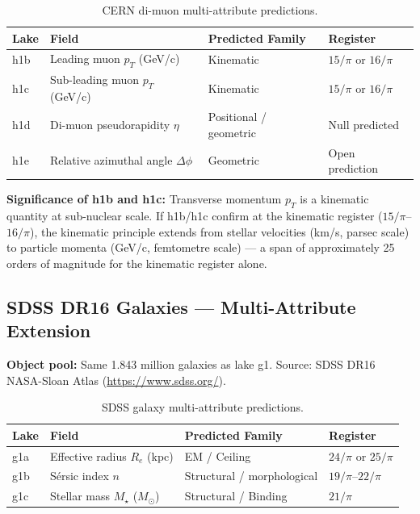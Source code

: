 \documentclass[12pt,a4paper]{article}
\begin{document}
\begin{table}[h!]
\centering
\caption{CERN di-muon multi-attribute predictions.}
\begin{tabular}{lp{4.5cm}p{4cm}l}
\toprule
\textbf{Lake} & \textbf{Field} & \textbf{Predicted Family} & \textbf{Register} \\
\midrule
h1b & Leading muon $p_T$ (GeV/c) & Kinematic & $15/\pi$ or $16/\pi$ \\
h1c & Sub-leading muon $p_T$ (GeV/c) & Kinematic & $15/\pi$ or $16/\pi$ \\
h1d & Di-muon pseudorapidity $\eta$ & Positional / geometric & Null predicted \\
h1e & Relative azimuthal angle $\Delta\phi$ & Geometric & Open prediction \\
\bottomrule
\end{tabular}
\end{table}

\textbf{Significance of h1b and h1c:} Transverse momentum $p_T$ is a kinematic
quantity at sub-nuclear scale. If h1b/h1c confirm at the kinematic register
($15/\pi$--$16/\pi$), the kinematic principle extends from stellar velocities
(km/s, parsec scale) to particle momenta (GeV/c, femtometre scale) --- a span
of approximately 25 orders of magnitude for the kinematic register alone.

\subsection{SDSS DR16 Galaxies --- Multi-Attribute Extension}

\textbf{Object pool:} Same 1.843 million galaxies as lake g1. Source: SDSS
DR16 NASA-Sloan Atlas (\url{https://www.sdss.org/}).

\begin{table}[h!]
\centering
\caption{SDSS galaxy multi-attribute predictions.}
\begin{tabular}{lp{4.5cm}p{4cm}l}
\toprule
\textbf{Lake} & \textbf{Field} & \textbf{Predicted Family} & \textbf{Register} \\
\midrule
g1a & Effective radius $R_e$ (kpc) & EM / Ceiling & $24/\pi$ or $25/\pi$ \\
g1b & S\'{e}rsic index $n$ & Structural / morphological & $19/\pi$--$22/\pi$ \\
g1c & Stellar mass $M_\star$ ($M_\odot$) & Structural / Binding & $21/\pi$ \\
\bottomrule
\end{tabular}
\end{table}
\end{document}
